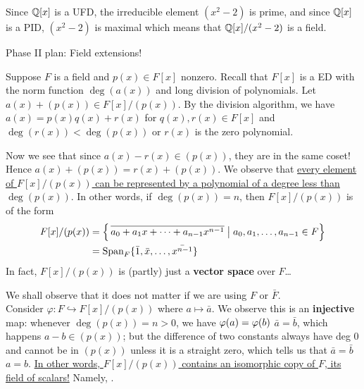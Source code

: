 \documentclass[12pt]{article}
\begin{document}
Since $\mathbb{Q}[x]$ is a UFD, the irreducible element $(x^2-2)$ is prime, and since $\mathbb{Q}[x]$ is a PID, $(x^2-2)$ is maximal which means that $\mathbb{Q}[x]/(x^2-2)$ is a field.

\spl
{}
\begin{tcolorbox}
    Phase II plan: Field extensions!
\end{tcolorbox}
\spl

Suppose $F$ is a field and $p(x)\in F[x]$ nonzero. Recall that $F[x]$ is a ED with the norm function $\deg (a(x))$ and long division of polynomials. Let $a(x)+(p(x))\in F[x]/(p(x))$. By the division algorithm, we have $a(x)=p(x)q(x)+r(x)$ for $q(x),r(x)\in F[x]$ and $\deg(r(x))<\deg(p(x))$ or $r(x)$ is the zero polynomial.

Now we see that since $a(x)-r(x)\in (p(x))$, they are in the same coset! Hence $a(x)+(p(x))=r(x)+(p(x))$. We observe that \uline{every element of $F[x]/(p(x))$ can be represented by a polynomial of a degree less than $\deg(p(x))$}. In other words, if $\deg(p(x))=n$, then $F[x]/(p(x))$ is of the form 
\begin{align*}
    F[x]/(p(x))&=\left \{\,\overline{a_0+a_1x+\dots +a_{n-1}x^{n-1}}\bigm\vert a_0,a_1,\dots,a_{n-1}\in F \right \}\\
    &= \text{Span}_F\{\bar 1, \bar x, \dots, \bar{x^{n-1}}\}
\end{align*}
In fact, $F[x]/(p(x))$ is (partly) just a \textbf{vector space} over $F$\dots

We shall observe that it does not matter if we are using $F$ or $\bar F$.\\
Consider $\varphi: F\hookrightarrow F[x]/(p(x))$ where $a\mapsto \bar a$. We observe this is an \textbf{injective} map: whenever $\deg(p(x))=n>0$, we have $\varphi (a)=\varphi (b)$ \ifnif $\bar a=\bar b$, which happens \ifnif $a-b\in (p(x))$; but the difference of two constants always have deg 0 and cannot be in $(p(x))$ unless it is a straight zero, which tells us that $\bar a = \bar b$ \ifnif $a=b$. \uline{In other words, $F[x]/(p(x))$ contains an isomorphic copy of $F$, its field of scalars!} Namely, .
\end{document}
